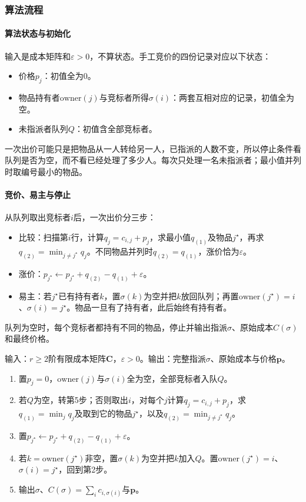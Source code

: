 \subsubsection{算法流程}

\paragraph{算法状态与初始化}
输入是成本矩阵和$\varepsilon>0$，不算状态。手工竞价的四份记录对应以下状态：
\begin{itemize}
  \item 价格$p_j$：初值全为$0$。
  \item 物品持有者$\mathrm{owner}(j)$与竞标者所得$\sigma(i)$：两套互相对应的记录，初值全为空。
  \item 未指派者队列$Q$：初值含全部竞标者。
\end{itemize}
一次出价可能只是把物品从一人转给另一人，已指派的人数不变，所以停止条件看队列是否为空，而不看已经处理了多少人。每次只处理一名未指派者；最小值并列时取编号最小的物品。

\paragraph{竞价、易主与停止}
从队列取出竞标者$i$后，一次出价分三步：
\begin{itemize}
  \item 比较：扫描第$i$行，计算$q_j=c_{i,j}+p_j$，求最小值$q_{(1)}$及物品$j^\star$，再求$q_{(2)}=\min_{j\neq j^\star}q_j$。不同物品并列时$q_{(2)}=q_{(1)}$，涨价恰为$\varepsilon$。
  \item 涨价：$p_{j^\star}\gets p_{j^\star}+q_{(2)}-q_{(1)}+\varepsilon$。
  \item 易主：若$j^\star$已有持有者$k$，置$\sigma(k)$为空并把$k$放回队列；再置$\mathrm{owner}(j^\star)=i$、$\sigma(i)=j^\star$。物品一旦有了持有者，此后始终有持有者。
\end{itemize}
队列为空时，每个竞标者都持有不同的物品，停止并输出指派$\sigma$、原始成本$C(\sigma)$和最终价格。

\begin{algorithm}[Auction算法]
\label{alg:graph-opt-auction}
输入：$r\geq2$阶有限成本矩阵$\bm C$，$\varepsilon>0$。输出：完整指派$\sigma$、原始成本与价格$\bm p$。
\begin{enumerate}
  \item 置$p_j=0$，$\mathrm{owner}(j)$与$\sigma(i)$全为空，全部竞标者入队$Q$。
  \item 若$Q$为空，转第5步；否则取出$i$，对每个$j$计算$q_j=c_{i,j}+p_j$，求$q_{(1)}=\min_jq_j$及取到它的物品$j^\star$，以及$q_{(2)}=\min_{j\neq j^\star}q_j$。
  \item 置$p_{j^\star}\gets p_{j^\star}+q_{(2)}-q_{(1)}+\varepsilon$。
  \item 若$k=\mathrm{owner}(j^\star)$非空，置$\sigma(k)$为空并把$k$加入$Q$。置$\mathrm{owner}(j^\star)=i$、$\sigma(i)=j^\star$，回到第2步。
  \item 输出$\sigma$、$C(\sigma)=\sum_ic_{i,\sigma(i)}$与$\bm p$。
\end{enumerate}
\end{algorithm}


